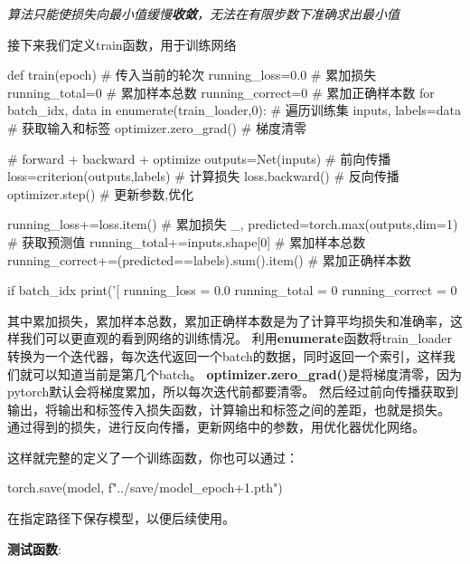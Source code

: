 \textit{算法只能使损失向最小值缓慢\textbf{收敛}，无法在有限步数下准确求出最小值}

接下来我们定义train函数，用于训练网络
\begin{tpython}
    def train(epoch) # 传入当前的轮次
        running_loss=0.0 # 累加损失
        running_total=0 # 累加样本总数
        running_correct=0 # 累加正确样本数
        for batch_idx, data in enumerate(train_loader,0): # 遍历训练集
            inputs, labels=data # 获取输入和标签
            optimizer.zero_grad() # 梯度清零

            # forward + backward + optimize
            outputs=Net(inputs) # 前向传播
            loss=criterion(outputs,labels) # 计算损失
            loss.backward() # 反向传播
            optimizer.step() # 更新参数,优化

            running_loss+=loss.item() # 累加损失
            _, predicted=torch.max(outputs,dim=1) # 获取预测值
            running_total+=inputs.shape[0] # 累加样本总数
            running_correct+=(predicted==labels).sum().item() # 累加正确样本数

            if batch_idx %
                print('[%
                running_loss = 0.0
                running_total = 0
                running_correct = 0
\end{tpython}

其中累加损失，累加样本总数，累加正确样本数是为了计算平均损失和准确率，这样我们可以更直观的看到网络的训练情况。
利用\textbf{enumerate}函数将train\_loader转换为一个迭代器，每次迭代返回一个batch的数据，同时返回一个索引，这样我们就可以知道当前是第几个batch。
\textbf{optimizer.zero\_grad()}是将梯度清零，因为pytorch默认会将梯度累加，所以每次迭代前都要清零。
然后经过前向传播获取到输出，将输出和标签传入损失函数，计算输出和标签之间的差距，也就是损失。
通过得到的损失，进行反向传播，更新网络中的参数，用优化器优化网络。

这样就完整的定义了一个训练函数，你也可以通过：
\begin{tpython}
    torch.save(model, f"../save/model_{epoch+1}.pth")
\end{tpython}
在指定路径下保存模型，以便后续使用。

\textbf{测试函数}:

